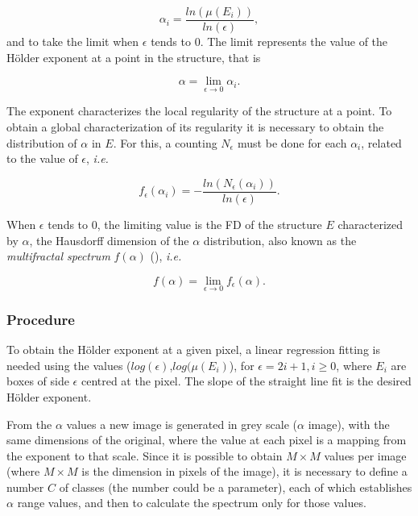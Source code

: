 \documentclass[oneside,a4paper,english,links]{article}
\begin{document}
\begin{equation}
\alpha_{i} = \frac{ln(\mu(E_{i}))}{ln(\epsilon)},
\label{eqn:eqn4}
\end{equation}
\noindent
and to take the limit when $\epsilon$ tends to $0$. The limit represents the value of the H\"older exponent at a point in the structure, that is

\begin{equation}
\alpha = \lim_{\epsilon\to0}{\alpha_{i}}.
\label{eqn:eqn5}
\end{equation}

The exponent characterizes the local regularity of the structure at a point. To obtain a global characterization of its regularity it is necessary to obtain the distribution of $\alpha$ in $E$. For this, a counting $N_{\epsilon}$ must be done for each $\alpha_{i}$, related to the value of $\epsilon$, {\em i.e.}

\begin{equation}
f_{\epsilon}(\alpha_{i}) = - \frac{ln(N_{\epsilon}(\alpha_{i}))}{ln(\epsilon)}.
\label{eqn:eqn6}
\end{equation}

When $\epsilon$ tends to $0$, the limiting value is the FD of the structure $E$ characterized by $\alpha$, the Hausdorff dimension of the $\alpha$ distribution, also known as the {\em multifractal spectrum} $f(\alpha)$ (\cite{Silvetti2010}), {\em i.e.}

\begin{equation}
f(\alpha) = \lim_{\epsilon\to0}{f_{\epsilon}(\alpha)}.
\label{eqn:eqn7}
\end{equation}

\subsubsection{Procedure}
To obtain the H\"older exponent at a given pixel, a linear regression fitting is needed using the values ($log(\epsilon)$,$log(\mu(E_{i})$), for $\epsilon = 2i + 1, i \ge 0$, where $E_{i}$ are boxes of side $\epsilon$ centred at the pixel. The slope of the straight line fit is the desired H\"older exponent.

From the $\alpha$ values a new image is generated in grey scale ($\alpha$ image), with the same dimensions of the original, where the value at each pixel is a mapping from the exponent to that scale. Since it is possible to obtain $M\times M$ values per image (where $M\times M$ is the dimension in pixels of the image), it is necessary to define a number $C$ of classes (the number could be a parameter), each of which establishes $\alpha$ range values, and then to calculate the spectrum only for those values.
\end{document}
